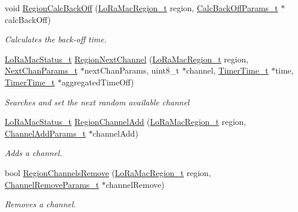 \begin{DoxyCompactItemize}
void \mbox{\hyperlink{group___r_e_g_i_o_n_ga07cfd135a3e8f85e15a5424c07f71d67}{Region\+Calc\+Back\+Off}} (\mbox{\hyperlink{group___l_o_r_a_m_a_c_ga80c48efda9ae02e14b58160d34a798dd}{Lo\+Ra\+Mac\+Region\+\_\+t}} region, \mbox{\hyperlink{group___r_e_g_i_o_n_ga7c5c9a8da174e6679eded8257dc92fd9}{Calc\+Back\+Off\+Params\+\_\+t}} $\ast$calc\+Back\+Off)
\begin{DoxyCompactList}\small\item\em Calculates the back-\/off time. \end{DoxyCompactList}\item 
\mbox{\hyperlink{group___l_o_r_a_m_a_c_ga30bd25657e10480f8605ee951b0ecfbd}{Lo\+Ra\+Mac\+Status\+\_\+t}} \mbox{\hyperlink{group___r_e_g_i_o_n_ga627b895f8bdd552639820ddfcfaa698e}{Region\+Next\+Channel}} (\mbox{\hyperlink{group___l_o_r_a_m_a_c_ga80c48efda9ae02e14b58160d34a798dd}{Lo\+Ra\+Mac\+Region\+\_\+t}} region, \mbox{\hyperlink{group___r_e_g_i_o_n_ga115f5e83afae352c0a3dcdc193374040}{Next\+Chan\+Params\+\_\+t}} $\ast$next\+Chan\+Params, uint8\+\_\+t $\ast$channel, \mbox{\hyperlink{utilities_8h_a4215ca43d3e953099ea758ce428599d0}{Timer\+Time\+\_\+t}} $\ast$time, \mbox{\hyperlink{utilities_8h_a4215ca43d3e953099ea758ce428599d0}{Timer\+Time\+\_\+t}} $\ast$aggregated\+Time\+Off)
\begin{DoxyCompactList}\small\item\em Searches and set the next random available channel \end{DoxyCompactList}\item 
\mbox{\hyperlink{group___l_o_r_a_m_a_c_ga30bd25657e10480f8605ee951b0ecfbd}{Lo\+Ra\+Mac\+Status\+\_\+t}} \mbox{\hyperlink{group___r_e_g_i_o_n_gaaa5767f33e988a641abf509ad278ae14}{Region\+Channel\+Add}} (\mbox{\hyperlink{group___l_o_r_a_m_a_c_ga80c48efda9ae02e14b58160d34a798dd}{Lo\+Ra\+Mac\+Region\+\_\+t}} region, \mbox{\hyperlink{group___r_e_g_i_o_n_gab1c5f3aa06614283202906cef4417860}{Channel\+Add\+Params\+\_\+t}} $\ast$channel\+Add)
\begin{DoxyCompactList}\small\item\em Adds a channel. \end{DoxyCompactList}\item 
bool \mbox{\hyperlink{group___r_e_g_i_o_n_ga50b3505e13d8373fef6e2be6d48e150c}{Region\+Channels\+Remove}} (\mbox{\hyperlink{group___l_o_r_a_m_a_c_ga80c48efda9ae02e14b58160d34a798dd}{Lo\+Ra\+Mac\+Region\+\_\+t}} region, \mbox{\hyperlink{group___r_e_g_i_o_n_gaa37468560d2fc81a977b57a48e5d72c0}{Channel\+Remove\+Params\+\_\+t}} $\ast$channel\+Remove)
\begin{DoxyCompactList}\small\item\em Removes a channel. \end{DoxyCompactList}\item 

\end{DoxyCompactItemize}
